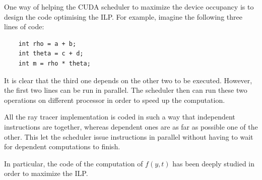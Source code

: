 One way of helping the \ac{CUDA} scheduler to maximize the device occupancy is to design the code optimising the \ac{ILP}. For example, imagine the following three lines of code:

\begin{lstlisting}
	int rho = a + b;
	int theta = c + d;
	int m = rho * theta;
\end{lstlisting}

It is clear that the third one depends on the other two to be executed. However, the first two lines can be run in parallel. The scheduler then can run these two operations on different processor in order to speed up the computation.

All the ray tracer implementation is coded in such a way that independent instructions are together, whereas dependent ones are as far as possible one of the other. This let the scheduler issue instructions in parallel without having to wait for dependent computations to finish.

In particular, the code of the computation of $f(y,t)$ has been deeply studied in order to maximize the \ac{ILP}.
